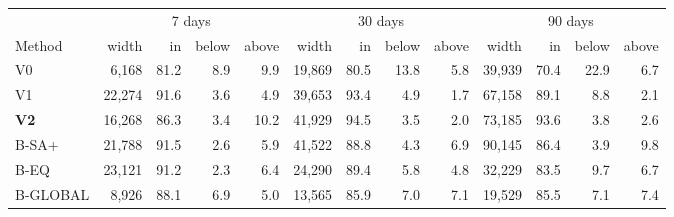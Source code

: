 \setlength{\tabcolsep}{3.5pt}
\begin{tabular}{l rrrr rrrr rrrr}
\toprule
 & \multicolumn{4}{c}{7 days} & \multicolumn{4}{c}{30 days} & \multicolumn{4}{c}{90 days}\\
\cmidrule(lr){2-5}\cmidrule(lr){6-9}\cmidrule(lr){10-13}
Method & width & in & below & above & width & in & below & above & width & in & below & above\\
\midrule
V0 & 6{,}168 & 81.2 & 8.9 & 9.9 & 19{,}869 & 80.5 & 13.8 & 5.8 & 39{,}939 & 70.4 & 22.9 & 6.7 \\
V1 & 22{,}274 & 91.6 & 3.6 & 4.9 & 39{,}653 & 93.4 & 4.9 & 1.7 & 67{,}158 & 89.1 & 8.8 & 2.1 \\
\textbf{V2} & 16{,}268 & 86.3 & 3.4 & 10.2 & 41{,}929 & 94.5 & 3.5 & 2.0 & 73{,}185 & 93.6 & 3.8 & 2.6 \\
B-SA+ & 21{,}788 & 91.5 & 2.6 & 5.9 & 41{,}522 & 88.8 & 4.3 & 6.9 & 90{,}145 & 86.4 & 3.9 & 9.8 \\
B-EQ & 23{,}121 & 91.2 & 2.3 & 6.4 & 24{,}290 & 89.4 & 5.8 & 4.8 & 32{,}229 & 83.5 & 9.7 & 6.7 \\
B-GLOBAL & 8{,}926 & 88.1 & 6.9 & 5.0 & 13{,}565 & 85.9 & 7.0 & 7.1 & 19{,}529 & 85.5 & 7.1 & 7.4 \\
\bottomrule
\end{tabular}
